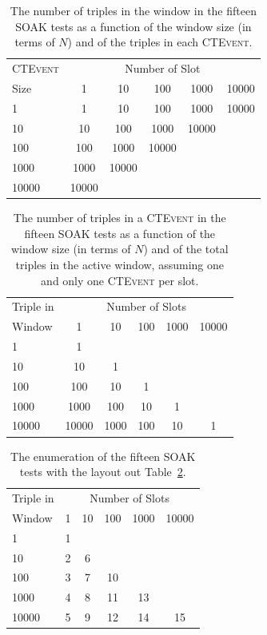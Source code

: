 \begin{table}[htb]
\centering
\small
 \begin{tabular}{l| ccccc}
	  	\hline
		\textsc{CTEvent}  &\multicolumn{5}{c}{Number of Slot}  \\
		Size  & 1 & 10 & 100 & 1000&10000 \\
		\hline	
		1 & 1& 10 & 100 & 1000&10000 \\
		10  & 10 & 100 & 1000&10000 \\
		100 & 100&1000&10000  \\
		1000 &1000 & 10000 \\
		10000&10000  \\
		\hline 
	\end{tabular}
	 \vspace{10pt}
	\caption[SOAK Tests Summary Table]{The number of triples in the window in the fifteen SOAK tests as a function of the window size (in terms of $N$) and of the triples in each \textsc{CTEvent}.}
	\label{tab:soaktests}
\end{table}

\begin{table}[htb]
	\centering
	\small
	\begin{tabular}{l | ccccc} %
	  	\hline
		Triple in & \multicolumn{5}{c}{Number of Slots}  \\
		Window  & 1 & 10 & 100 & 1000&10000\\
		\hline
		1  	 & 1\\
		10   & 10  & 1 \\
		100  & 100 & 10 & 1\\
		1000 & 1000& 100& 10& 1\\
		10000& 10000 & 1000& 100& 10& 1\\
		\hline %
	 \end{tabular}
	\caption[SOAK Tests Summary Table Alternative Layout]{The number of triples in a \textsc{CTEvent} in the fifteen SOAK tests as a function of the window size (in terms of $N$) and of the total triples in the active window, assuming one and only one \textsc{CTEvent} per slot.}
	\label{tab:soaktests-alt}
\end{table}


\begin{table}[htb]
	\centering
	\small
	\begin{tabular}{l | ccccc} %
	  	\hline
		Triple in & \multicolumn{5}{c}{Number of Slots}  \\
		Window  & 1 & 10 & 100 & 1000&10000\\
		\hline
		1  	 & 1\\
		10   & 2  & 6 \\
		100  & 3 & 7 & 10\\
		1000 & 4& 8& 11& 13\\
		10000& 5 & 9& 12& 14& 15\\
		\hline %
	 \end{tabular}
	\caption[SOAK Tests Enumeration Table - Alternative Layout]{The enumeration of the fifteen SOAK tests with the layout out Table~\ref{tab:soaktests-alt}.}
	\label{tab:soaktests-enum-alt}
\end{table}

